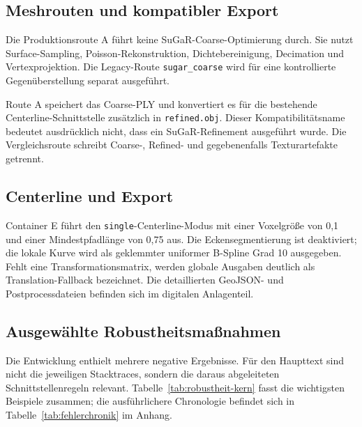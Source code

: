 \subsection{Meshrouten und kompatibler Export}

Die Produktionsroute A führt keine SuGaR-Coarse-Optimierung durch. Sie nutzt
Surface-Sampling, Poisson-Rekonstruktion, Dichtebereinigung, Decimation und
Vertexprojektion. Die Legacy-Route \texttt{sugar\_coarse} wird für eine
kontrollierte Gegenüberstellung separat ausgeführt.

Route A speichert das Coarse-PLY und konvertiert es für die bestehende
Centerline-Schnittstelle zusätzlich in \texttt{refined.obj}. Dieser
Kompatibilitätsname bedeutet ausdrücklich nicht, dass ein SuGaR-Refinement
ausgeführt wurde. Die Vergleichsroute schreibt Coarse-, Refined- und
gegebenenfalls Texturartefakte getrennt.

\subsection{Centerline und Export}

Container E führt den \texttt{single}-Centerline-Modus mit einer Voxelgröße von
0,1 und einer Mindestpfadlänge von 0,75 aus. Die Eckensegmentierung ist
deaktiviert; die lokale Kurve wird als geklemmter uniformer B-Spline Grad 10
ausgegeben. Fehlt eine Transformationsmatrix, werden globale Ausgaben deutlich
als Translation-Fallback bezeichnet. Die detaillierten GeoJSON- und
Postprocessdateien befinden sich im digitalen Anlagenteil.

\subsection{Ausgewählte Robustheitsmaßnahmen}

Die Entwicklung enthielt mehrere negative Ergebnisse. Für den Haupttext sind
nicht die jeweiligen Stacktraces, sondern die daraus abgeleiteten
Schnittstellenregeln relevant. Tabelle~\ref{tab:robustheit-kern} fasst die
wichtigsten Beispiele zusammen; die ausführlichere Chronologie befindet sich
in Tabelle~\ref{tab:fehlerchronik} im Anhang.

